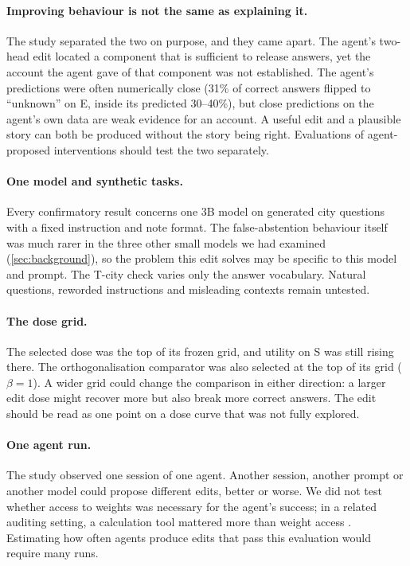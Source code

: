 \paragraph{Improving behaviour is not the same as explaining it.}
The study separated the two on purpose, and they came apart. The agent's two-head edit located a component that is
sufficient to release answers, yet the account the agent gave of that component was not established. The agent's
predictions were often numerically close (31\% of correct answers flipped to ``unknown'' on E, inside its predicted
30--40\%), but close predictions on the agent's own data are weak evidence for an account. A useful edit and a
plausible story can both be produced without the story being right. Evaluations of agent-proposed interventions
should test the two separately.

\paragraph{One model and synthetic tasks.}
Every confirmatory result concerns one 3B model on generated city questions with a fixed instruction and note
format. The false-abstention behaviour itself was much rarer in the three other small models we had examined
(\cref{sec:background}), so the problem this edit solves may be specific to this model and prompt. The T-city check
varies only the answer vocabulary. Natural questions, reworded instructions and misleading contexts
\citep{setiawan2026grabrag} remain untested.

\paragraph{The dose grid.}
The selected dose was the top of its frozen grid, and utility on S was still rising there. The orthogonalisation
comparator was also selected at the top of its grid ($\beta = 1$). A wider grid could change the comparison in either
direction: a larger edit dose might recover more but also break more correct answers. The edit should be read as one
point on a dose curve that was not fully explored.

\paragraph{One agent run.}
The study observed one session of one agent. Another session, another prompt or another model could propose different
edits, better or worse. We did not test whether access to weights was necessary for the agent's success; in a related
auditing setting, a calculation tool mattered more than weight access \citep{liu2026auditors}. Estimating how often
agents produce edits that pass this evaluation would require many runs.

